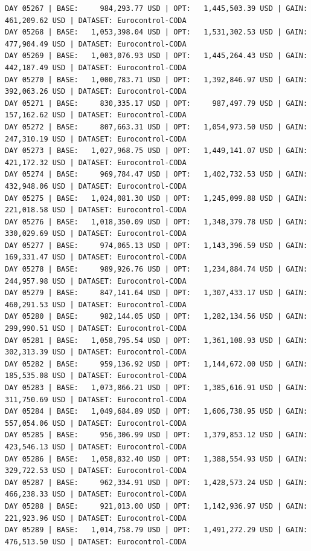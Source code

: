 \documentclass[11pt,a4paper]{article}
\begin{document}
\begin{verbatim}
DAY 05267 | BASE:     984,293.77 USD | OPT:   1,445,503.39 USD | GAIN: 461,209.62 USD | DATASET: Eurocontrol-CODA
DAY 05268 | BASE:   1,053,398.04 USD | OPT:   1,531,302.53 USD | GAIN: 477,904.49 USD | DATASET: Eurocontrol-CODA
DAY 05269 | BASE:   1,003,076.93 USD | OPT:   1,445,264.43 USD | GAIN: 442,187.49 USD | DATASET: Eurocontrol-CODA
DAY 05270 | BASE:   1,000,783.71 USD | OPT:   1,392,846.97 USD | GAIN: 392,063.26 USD | DATASET: Eurocontrol-CODA
DAY 05271 | BASE:     830,335.17 USD | OPT:     987,497.79 USD | GAIN: 157,162.62 USD | DATASET: Eurocontrol-CODA
DAY 05272 | BASE:     807,663.31 USD | OPT:   1,054,973.50 USD | GAIN: 247,310.19 USD | DATASET: Eurocontrol-CODA
DAY 05273 | BASE:   1,027,968.75 USD | OPT:   1,449,141.07 USD | GAIN: 421,172.32 USD | DATASET: Eurocontrol-CODA
DAY 05274 | BASE:     969,784.47 USD | OPT:   1,402,732.53 USD | GAIN: 432,948.06 USD | DATASET: Eurocontrol-CODA
DAY 05275 | BASE:   1,024,081.30 USD | OPT:   1,245,099.88 USD | GAIN: 221,018.58 USD | DATASET: Eurocontrol-CODA
DAY 05276 | BASE:   1,018,350.09 USD | OPT:   1,348,379.78 USD | GAIN: 330,029.69 USD | DATASET: Eurocontrol-CODA
DAY 05277 | BASE:     974,065.13 USD | OPT:   1,143,396.59 USD | GAIN: 169,331.47 USD | DATASET: Eurocontrol-CODA
DAY 05278 | BASE:     989,926.76 USD | OPT:   1,234,884.74 USD | GAIN: 244,957.98 USD | DATASET: Eurocontrol-CODA
DAY 05279 | BASE:     847,141.64 USD | OPT:   1,307,433.17 USD | GAIN: 460,291.53 USD | DATASET: Eurocontrol-CODA
DAY 05280 | BASE:     982,144.05 USD | OPT:   1,282,134.56 USD | GAIN: 299,990.51 USD | DATASET: Eurocontrol-CODA
DAY 05281 | BASE:   1,058,795.54 USD | OPT:   1,361,108.93 USD | GAIN: 302,313.39 USD | DATASET: Eurocontrol-CODA
DAY 05282 | BASE:     959,136.92 USD | OPT:   1,144,672.00 USD | GAIN: 185,535.08 USD | DATASET: Eurocontrol-CODA
DAY 05283 | BASE:   1,073,866.21 USD | OPT:   1,385,616.91 USD | GAIN: 311,750.69 USD | DATASET: Eurocontrol-CODA
DAY 05284 | BASE:   1,049,684.89 USD | OPT:   1,606,738.95 USD | GAIN: 557,054.06 USD | DATASET: Eurocontrol-CODA
DAY 05285 | BASE:     956,306.99 USD | OPT:   1,379,853.12 USD | GAIN: 423,546.13 USD | DATASET: Eurocontrol-CODA
DAY 05286 | BASE:   1,058,832.40 USD | OPT:   1,388,554.93 USD | GAIN: 329,722.53 USD | DATASET: Eurocontrol-CODA
DAY 05287 | BASE:     962,334.91 USD | OPT:   1,428,573.24 USD | GAIN: 466,238.33 USD | DATASET: Eurocontrol-CODA
DAY 05288 | BASE:     921,013.00 USD | OPT:   1,142,936.97 USD | GAIN: 221,923.96 USD | DATASET: Eurocontrol-CODA
DAY 05289 | BASE:   1,014,758.79 USD | OPT:   1,491,272.29 USD | GAIN: 476,513.50 USD | DATASET: Eurocontrol-CODA

\end{verbatim}
\end{document}
